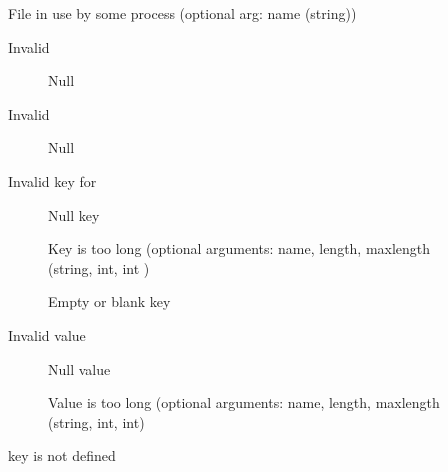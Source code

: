 \begin{description}
\item[ ]File in use by
some process (optional 
  arg: name (string))
\item[ ]Invalid 
    \begin{description}
    \item[ ]Null
    \end{description}
\item[ ]Invalid 
    \begin{description}
    \item[ ]Null
    \end{description}
\item[ ]Invalid key for
    \begin{description}
    \item[ ]Null key
    \item[ ]Key
    is too long (optional 
      arguments: name, length, maxlength (string, int, int )
    \item[
    ]Empty or blank key 
    \end{description}
\item[ ]Invalid
     value 
    \begin{description}
    \item[ ]Null value
    \item[
    ]Value is too long (optional 
      arguments: name, length, maxlength (string, int, int)
    \end{description}
\item[
    ] key is not defined 

\end{description}
